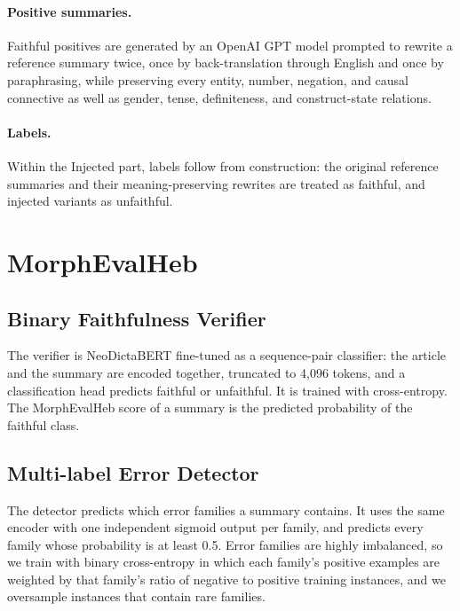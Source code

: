 \documentclass[11pt]{article}
\begin{document}
\paragraph{Positive summaries.}
Faithful positives are generated by an OpenAI GPT model prompted to rewrite a reference summary twice, once by back-translation through English and once by paraphrasing, while preserving every entity, number, negation, and causal connective as well as gender, tense, definiteness, and construct-state relations.

\paragraph{Labels.}
Within the Injected part, labels follow from construction: the original reference summaries and their meaning-preserving rewrites are treated as faithful, and injected variants as unfaithful.

\section{MorphEvalHeb}
\label{sec:model}

\subsection{Binary Faithfulness Verifier}
\label{sec:binary}
The verifier is NeoDictaBERT fine-tuned as a sequence-pair classifier: the article and the summary are encoded together, truncated to 4,096 tokens, and a classification head predicts faithful or unfaithful. It is trained with cross-entropy. The MorphEvalHeb score of a summary is the predicted probability of the faithful class.

\subsection{Multi-label Error Detector}
\label{sec:multilabel}
The detector predicts which error families a summary contains. It uses the same encoder with one independent sigmoid output per family, and predicts every family whose probability is at least 0.5. Error families are highly imbalanced, so we train with binary cross-entropy in which each family's positive examples are weighted by that family's ratio of negative to positive training instances, and we oversample instances that contain rare families.
\end{document}

